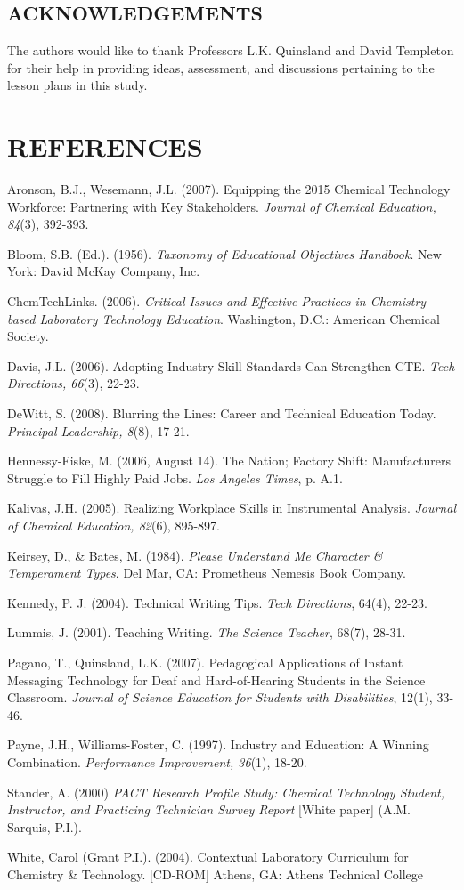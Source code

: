 \documentclass[11.5pt]{sig-alternate} %
\begin{document}
\begin{large}
\section*{ACKNOWLEDGEMENTS}

The authors would like to thank Professors L.K. Quinsland and David Templeton for their help in providing ideas, assessment, and discussions pertaining to the lesson plans in this study.

\end{large}
\clearpage
\section*{REFERENCES}\par 

\leftskip 0.25in
\parindent -0.25in 

Aronson, B.J., Wesemann, J.L. (2007). Equipping the 2015 Chemical Technology Workforce: Partnering with Key Stakeholders. \textit{Journal of Chemical Education, 84}(3), 392-393.

Bloom, S.B. (Ed.). (1956). \textit{Taxonomy of Educational Objectives Handbook}. New York: David McKay Company, Inc.

ChemTechLinks. (2006). \textit{Critical Issues and Effective Practices in Chemistry-based Laboratory Technology Education}. Washington, D.C.: American Chemical Society.

Davis, J.L. (2006). Adopting Industry Skill Standards Can Strengthen CTE. \textit{Tech Directions, 66}(3), 22-23.

DeWitt, S. (2008). Blurring the Lines: Career and Technical Education Today. \textit{Principal Leadership, 8}(8), 17-21.

Hennessy-Fiske, M. (2006, August 14). The Nation; Factory Shift: Manufacturers Struggle to Fill Highly Paid Jobs. \textit{Los Angeles Times}, p. A.1.

Kalivas, J.H. (2005). Realizing Workplace Skills in Instrumental Analysis. \textit{Journal of Chemical Education, 82}(6), 895-897.

Keirsey, D., \& Bates, M. (1984). \textit{Please Understand Me Character \& Temperament Types}. Del Mar, CA: Prometheus Nemesis Book Company.

Kennedy, P. J. (2004). Technical Writing Tips. \textit{Tech Directions}, 64(4), 22-23.

Lummis, J. (2001). Teaching Writing. \textit{The Science Teacher}, 68(7), 28-31.

Pagano, T., Quinsland, L.K. (2007). Pedagogical Applications of Instant Messaging Technology for Deaf and Hard-of-Hearing Students in the Science Classroom. \textit{Journal of Science Education for Students with Disabilities}, 12(1), 33-46.

Payne, J.H., Williams-Foster, C. (1997). Industry and Education: A Winning Combination. \textit{Performance Improvement, 36}(1), 18-20.

Stander, A. (2000) \textit{PACT Research Profile Study: Chemical Technology Student, Instructor, and Practicing Technician Survey Report} [White paper] (A.M. Sarquis, P.I.).

White, Carol (Grant P.I.). (2004). Contextual Laboratory Curriculum for Chemistry \& Technology. [CD-ROM] Athens, GA: Athens Technical College
\end{document}
